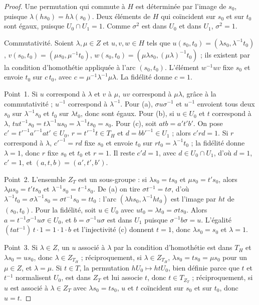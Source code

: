 \begin{proof}
Une permutation qui commute à $H$ est déterminée par l'image de $s_0$, puisque $\lambda(hs_0) = h\lambda(s_0)$. Deux éléments de $H$ qui coïncident sur $s_0$ et sur $t_0$ sont égaux, puisque $U_0 \cap U_1 = 1$. Comme $\sigma^2$ est dans $U_0$ et dans $U_1$, $\sigma^2 = 1$.

Commutativité. Soient $\lambda, \mu \in Z$ et $u, v, w \in H$ tels que $u(s_0, t_0) = (\lambda s_0, \lambda^{-1}t_0)$, $v(s_0, t_0) = (\mu s_0, \mu^{-1}t_0)$, $w(s_0, t_0) = (\mu\lambda s_0, (\mu\lambda)^{-1}t_0)$ ; ils existent par la condition d'homothétie appliquée à l'arc $(s_0, t_0)$. L'élément $w^{-1}uv$ fixe $s_0$ et envoie $t_0$ sur $c\,t_0$, avec $c = \mu^{-1}\lambda^{-1}\mu\lambda$. La fidélité donne $c = 1$.

Point~1. Si $u$ correspond à $\lambda$ et $v$ à $\mu$, $uv$ correspond à $\mu\lambda$, grâce à la commutativité ; $u^{-1}$ correspond à $\lambda^{-1}$. Pour (a), $\sigma u \sigma^{-1}$ et $u^{-1}$ envoient tous deux $s_0$ sur $\lambda^{-1}s_0$ et $t_0$ sur $\lambda t_0$, donc sont égaux. Pour (b), si $u \in U_0$ et $t$ correspond à $\lambda$, $tut^{-1}s_0 = t\lambda^{-1}us_0 = \lambda^{-1}ts_0 = s_0$. Pour (c), soit $a t b = a' t' b'$. On pose $c' = t'^{-1}a'^{-1}at' \in U_0$, $r = t'^{-1}t \in T_H$ et $d = bb'^{-1} \in U_1$ ; alors $c'rd = 1$. Si $r$ correspond à $\lambda$, $c'^{-1} = rd$ fixe $s_0$ et envoie $t_0$ sur $rt_0 = \lambda^{-1}t_0$ ; la fidélité donne $\lambda = 1$, donc $r$ fixe $s_0$ et $t_0$ et $r = 1$. Il reste $c'd = 1$, avec $d \in U_0 \cap U_1$, d'où $d = 1$, $c' = 1$, et $(a, t, b) = (a', t', b')$.

Point~2. L'ensemble $Z_T$ est un sous-groupe : si $\lambda s_0 = ts_0$ et $\mu s_0 = t's_0$, alors $\lambda\mu s_0 = t'ts_0$ et $\lambda^{-1}s_0 = t^{-1}s_0$. De (a) on tire $\sigma t^{-1} = t\sigma$, d'où $\lambda^{-1}t_0 = \sigma\lambda^{-1}s_0 = \sigma t^{-1}s_0 = t t_0$ : l'arc $(\lambda hs_0, \lambda^{-1}ht_0)$ est l'image par $ht$ de $(s_0, t_0)$. Pour la fidélité, soit $u \in U_0$ avec $ut_0 = \lambda t_0 = \sigma t s_0$. Alors $a = t^{-1}\sigma^{-1}u\sigma \in U_0$, et $b = \sigma^{-1}u\sigma$ est dans $U_1$ puisque $\sigma^{-1}b\sigma = u$. L'égalité $(tat^{-1})\, t \cdot 1 = 1 \cdot 1 \cdot b$ et l'injectivité (c) donnent $t = 1$, donc $\lambda s_0 = s_0$ et $\lambda = 1$.

Point~3. Si $\lambda \in Z$, un $u$ associé à $\lambda$ par la condition d'homothétie est dans $T_H$ et $\lambda s_0 = us_0$, donc $\lambda \in Z_{T_H}$ ; réciproquement, si $\lambda \in Z_{T_H}$, $\lambda s_0 = ts_0 = \mu s_0$ pour un $\mu \in Z$, et $\lambda = \mu$. Si $t \in T$, la permutation $hU_0 \mapsto htU_0$, bien définie parce que $t$ et $t^{-1}$ normalisent $U_0$, est dans $Z_T$ et lui associe $t$, donc $t \in T_{Z_T}$ ; réciproquement, si $u$ est associé à $\lambda \in Z_T$ avec $\lambda s_0 = ts_0$, $u$ et $t$ coïncident sur $s_0$ et sur $t_0$, donc $u = t$.
\end{proof}

